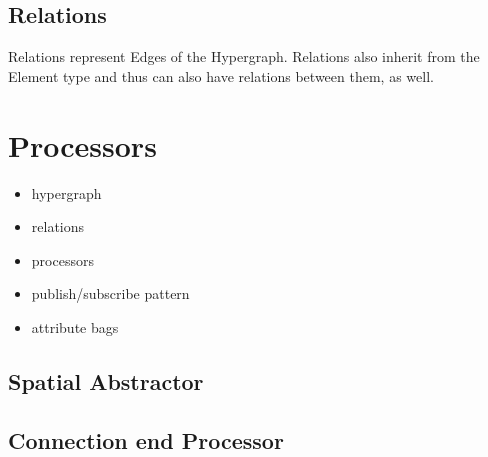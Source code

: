 \subsection{Relations}
Relations represent Edges of the Hypergraph. Relations also inherit from the Element type and thus can also have relations between them, as well. 


\section{Processors}




\begin{itemize}
  \item hypergraph
  \item relations
  \item processors
  \item publish/subscribe pattern
  \item attribute bags
\end{itemize}

\subsection{Spatial Abstractor}

\subsection{Connection end Processor}
